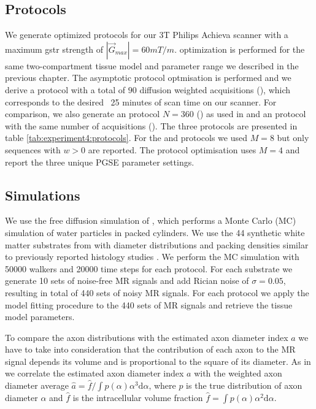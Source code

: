 \subsection*{Protocols}
We generate optimized protocols for our 3T Philips Achieva scanner with a maximum {\gls{gstr}} strength of $|\vec{G}_{max}|=60mT/m$. \SFasym{} optimization is performed for the same two-compartment tissue model and parameter range we described in the previous chapter. The asymptotic \SFasym protocol optmisation is performed and we derive a protocol with a total of $90$ diffusion weighted acquisitions (\SFshort), which corresponds to the desired ~25 minutes of scan time on our scanner. For comparison, we also generate an \OI protocol $N=360$ (\OIlong) as used in \citep{Alexander:2010} and an \SFasym protocol with the same number of acquisitions (\SFlong). The three protocols are presented in table \ref{tab:experiment4:protocols}. For the \SFshort{} and \SFlong{} protocols we used $M=8$ but only sequences with $w>0$ are reported. The \OIlong{} protocol optimisation uses $M=4$ and report the three unique {\gls{PGSE}} parameter settings.
\subsection*{Simulations}
We use the free diffusion simulation of \citet{Hall:2009}, which performs a Monte Carlo (MC) simulation of water particles in packed cylinders. We use the 44 synthetic white matter substrates from\citet{Alexander:2010} with diameter distributions and packing densities similar to previously reported histology studies \citep{GrafvonKeyserlingk:1984,LaMantia:1990,Aboitiz:1992}.%
We perform the MC simulation with 50000 walkers and 20000 time steps for each protocol. For each substrate we generate 10 sets of noise-free MR signals and add Rician noise of $\sigma=0.05$, resulting in  total of 440 sets of noisy MR signals. For each protocol we apply the model fitting procedure to the 440 sets of MR signals and retrieve the tissue model parameters.

To compare the axon distributions with the estimated axon diameter index $a$ we have to take into consideration that the contribution of each axon to the MR signal depends its volume and is proportional to the square of its diameter. As in \citet{Alexander:2010} we correlate the estimated axon diameter index $a$ with the weighted axon diameter average $\hat{a} = \hat{f} / \int p(\alpha)\alpha^3\mbox{d}\alpha$, where $p$ is the true distribution of axon diameter $\alpha$ and $\hat{f}$ is the intracellular volume fraction $\hat{f} = \int p(\alpha)\alpha^2\mbox{d}\alpha.$

